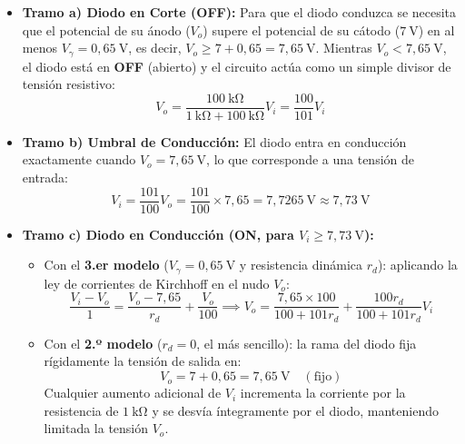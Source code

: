 \begin{ejemplo}
\begin{itemize}[leftmargin=*]
    \item \textbf{Tramo a) Diodo en Corte (OFF):} Para que el diodo conduzca se necesita que el potencial de su ánodo ($V_o$) supere el potencial de su cátodo ($7\ \si{\volt}$) en al menos $V_\gamma = 0{,}65\ \si{\volt}$, es decir, $V_o \ge 7 + 0{,}65 = 7{,}65\ \si{\volt}$. Mientras $V_o < 7{,}65\ \si{\volt}$, el diodo está en \textbf{OFF} (abierto) y el circuito actúa como un simple divisor de tensión resistivo:
    \begin{equation}
        V_o = \frac{100\ \si{\kilo\ohm}}{1\ \si{\kilo\ohm} + 100\ \si{\kilo\ohm}} V_i = \frac{100}{101} V_i
    \end{equation}
    \item \textbf{Tramo b) Umbral de Conducción:} El diodo entra en conducción exactamente cuando $V_o = 7{,}65\ \si{\volt}$, lo que corresponde a una tensión de entrada:
    \begin{equation}
        V_i = \frac{101}{100} V_o = \frac{101}{100} \times 7{,}65 = 7{,}7265\ \si{\volt} \approx 7{,}73\ \si{\volt}
    \end{equation}
    \item \textbf{Tramo c) Diodo en Conducción (ON, para $V_i \ge 7{,}73\ \si{\volt}$):}
    \begin{itemize}
        \item Con el \textbf{3.er modelo} ($V_\gamma = 0{,}65\ \si{\volt}$ y resistencia dinámica $r_d$): aplicando la ley de corrientes de Kirchhoff en el nudo $V_o$:
        \begin{equation}
            \frac{V_i - V_o}{1} = \frac{V_o - 7{,}65}{r_d} + \frac{V_o}{100} \implies V_o = \frac{7{,}65 \times 100}{100 + 101 r_d} + \frac{100 r_d}{100 + 101 r_d} V_i
        \end{equation}
        \item Con el \textbf{2.º modelo} ($r_d = 0$, el más sencillo): la rama del diodo fija rígidamente la tensión de salida en:
        \begin{equation}
            V_o = 7 + 0{,}65 = 7{,}65\ \si{\volt} \quad (\text{fijo})
        \end{equation}
        Cualquier aumento adicional de $V_i$ incrementa la corriente por la resistencia de $1\ \si{\kilo\ohm}$ y se desvía íntegramente por el diodo, manteniendo limitada la tensión $V_o$.
    \end{itemize}
\end{itemize}
\end{ejemplo}

